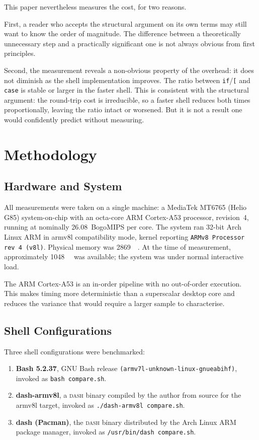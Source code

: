 \documentclass[11pt,a4paper]{article}
\begin{document}
This paper nevertheless measures the cost, for two reasons.

First, a reader who accepts the structural argument on its own terms
may still want to know the order of magnitude.
The difference between a theoretically unnecessary step and a
practically significant one is not always obvious from first
principles.

Second, the measurement reveals a non-obvious property of the
overhead: it does not diminish as the shell implementation improves.
The ratio between \texttt{if}/\texttt{[} and \texttt{case} is
stable or larger in the faster shell.
This is consistent with the structural argument: the round-trip
cost is irreducible, so a faster shell reduces both times
proportionally, leaving the ratio intact or worsened. But it is
not a result one would confidently predict without measuring.

\section{Methodology}

\subsection{Hardware and System}

All measurements were taken on a single machine: a MediaTek MT6765
(Helio G85) system-on-chip with an octa-core ARM Cortex-A53
processor, revision~4, running at nominally 26.08~BogoMIPS per core.
The system ran 32-bit Arch Linux ARM in armv8l compatibility mode,
kernel reporting \texttt{ARMv8 Processor rev~4 (v8l)}.
Physical memory was \SI{2869}{\mega\byte}.
At the time of measurement, approximately \SI{1048}{\mega\byte} was
available; the system was under normal interactive load.

The ARM Cortex-A53 is an in-order pipeline with no out-of-order
execution.
This makes timing more deterministic than a superscalar desktop core
and reduces the variance that would require a larger sample to
characterise.

\subsection{Shell Configurations}

Three shell configurations were benchmarked:

\begin{enumerate}
  \item \textbf{Bash 5.2.37}, GNU Bash release
        \texttt{(armv7l-unknown-linux-gnueabihf)}, invoked as
        \texttt{bash compare.sh}.

  \item \textbf{dash-armv8l}, a \textsc{dash} binary compiled by the
        author from source for the armv8l target, invoked as
        \texttt{./dash-armv8l compare.sh}.

  \item \textbf{dash (Pacman)}, the \textsc{dash} binary distributed
        by the Arch Linux ARM package manager, invoked as
        \texttt{/usr/bin/dash compare.sh}.
\end{enumerate}
\end{document}
